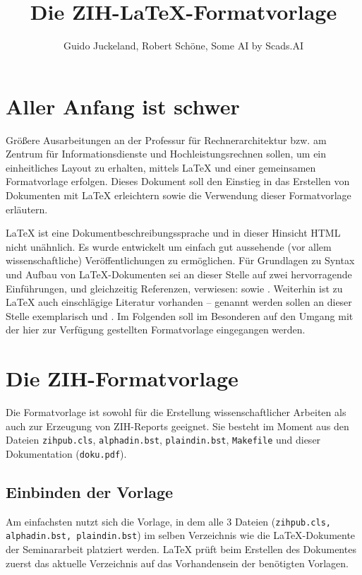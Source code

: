 \documentclass[plainarticle,zihtitle,german,final,hyperref,utf8,wrapper]{zihpub}
\author{Guido Juckeland, Robert Schöne, Some AI by Scads.AI}
\title{Die ZIH-\LaTeX-Formatvorlage}
\begin{document}
\section{Aller Anfang ist schwer}
Gr\"o{\ss}ere Ausarbeitungen an der Professur f\"ur Rechnerarchitektur bzw. am Zentrum f\"ur Informationsdienste und Hochleistungsrechnen sollen, um ein einheitliches Layout zu erhalten, mittels {\LaTeX} und einer gemeinsamen Formatvorlage erfolgen. 
Dieses Dokument soll den Einstieg in das Erstellen von Dokumenten mit {\LaTeX} erleichtern sowie die Verwendung dieser Formatvorlage erl\"autern.

{\LaTeX} ist eine Dokumentbeschreibungssprache und in dieser Hinsicht HTML nicht un\"ahnlich. 
Es wurde entwickelt um einfach gut aussehende (vor allem wissenschaftliche) Ver\"offentlichungen zu erm\"oglichen. 
F\"ur Grundlagen zu Syntax und Aufbau von {\LaTeX}-Dokumenten sei an dieser Stelle auf zwei hervorragende Einf\"uhrungen, und gleichzeitig Referenzen, verwiesen: \cite{kochbuch} sowie \cite{rudl}. 
Weiterhin ist zu {\LaTeX} auch einschl\"agige Literatur vorhanden -- genannt werden sollen an dieser Stelle exemplarisch \cite{begleiter} und \cite{kopka}. 
Im Folgenden soll im Besonderen auf den Umgang mit der hier zur Verf\"ugung gestellten Formatvorlage eingegangen werden.

\section{Die ZIH-Formatvorlage}
Die Formatvorlage ist sowohl f\"ur die Erstellung wissenschaftlicher Arbeiten als auch zur Erzeugung von ZIH-Reports geeignet. 
Sie besteht im Moment aus den Dateien \texttt{zihpub.cls}, \texttt{alphadin.bst}, \texttt{plaindin.bst}, \texttt{Makefile} und dieser Dokumentation (\texttt{doku.pdf}).


\subsection{Einbinden der Vorlage}
Am einfachsten nutzt sich die Vorlage, in dem alle 3 Dateien (\texttt{zihpub.cls, alphadin.bst, plaindin.bst}) im selben Verzeichnis wie die {\LaTeX}-Dokumente der Seminararbeit platziert werden. 
{\LaTeX} pr\"uft beim Erstellen des Dokumentes zuerst das aktuelle Verzeichnis auf das Vorhandensein der ben\"otigten Vorlagen.
\end{document}
